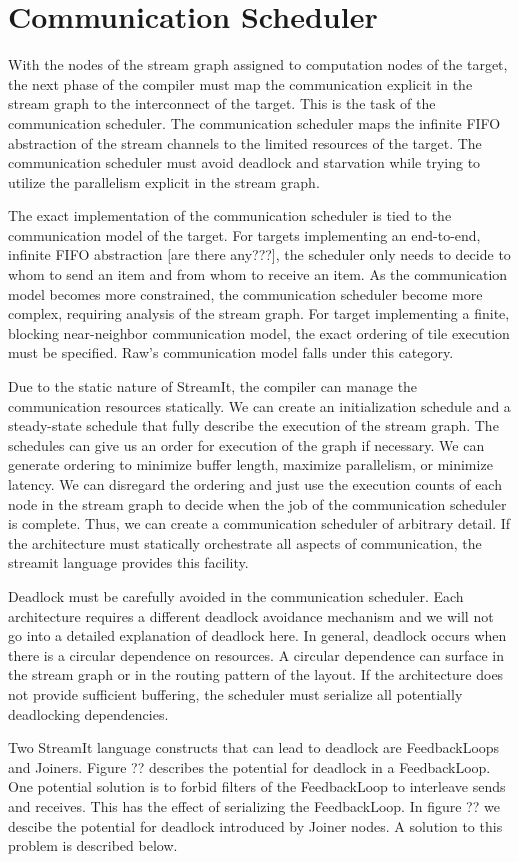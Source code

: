 \section{Communication Scheduler}
With the nodes of the stream graph assigned to computation nodes of
the target, the next phase of the compiler must map the communication
explicit in the stream graph to the interconnect of the target.  This
is the task of the communication scheduler.  The communication
scheduler maps the infinite FIFO abstraction of the stream channels to
the limited resources of the target.  The communication scheduler must
avoid deadlock and starvation while trying to utilize the parallelism
explicit in the stream graph.

The exact implementation of the communication scheduler is tied to the
communication model of the target.  For targets implementing an
end-to-end, infinite FIFO abstraction [are there any???], the
scheduler only needs to decide to whom to send an item and from whom
to receive an item.  As the communication model becomes more
constrained, the communication scheduler become more complex,
requiring analysis of the stream graph. For target implementing a
finite, blocking near-neighbor communication model, the exact ordering
of tile execution must be specified.  Raw's communication model falls
under this category.

Due to the static nature of StreamIt, the compiler can manage the
communication resources statically.  We can create an initialization
schedule and a steady-state schedule that fully describe the execution
of the stream graph.  The schedules can give us an order for execution
of the graph if necessary.  We can generate ordering to minimize
buffer length, maximize parallelism, or minimize latency.  We can
disregard the ordering and just use the execution counts of each node
in the stream graph to decide when the job of the communication
scheduler is complete.  Thus, we can create a communication scheduler
of arbitrary detail.  If the architecture must statically orchestrate
all aspects of communication, the streamit language provides this
facility.

Deadlock must be carefully avoided in the communication
scheduler. Each architecture requires a different deadlock avoidance
mechanism and we will not go into a detailed explanation of deadlock
here.  In general, deadlock occurs when there is a circular dependence
on resources.  A circular dependence can surface in the stream graph
or in the routing pattern of the layout.  If the architecture does not
provide sufficient buffering, the scheduler must serialize all
potentially deadlocking dependencies.

Two StreamIt language constructs that can lead to deadlock are
FeedbackLoops and Joiners. Figure ?? describes the potential for
deadlock in a FeedbackLoop.  One potential solution is to forbid
filters of the FeedbackLoop to interleave sends and receives.  This
has the effect of serializing the FeedbackLoop. In figure ?? we
descibe the potential for deadlock introduced by Joiner nodes.  A
solution to this problem is described below.
